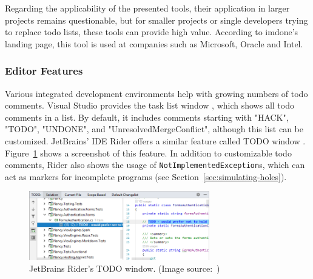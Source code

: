 Regarding the applicability of the presented tools, their application in larger projects remains questionable, but for smaller projects or single developers trying to replace todo lists, these tools can provide high value.
According to imdone's landing page, this tool is used at companies such as Microsoft, Oracle and Intel.

\subsubsection{Editor Features}
\label{sec:todo-comments-ide-features}
Various integrated development environments help with growing numbers of todo comments.
Visual Studio provides the task list window \cite{hogensen_use_2019}, which shows all todo comments in a list.
By default, it includes comments starting with "HACK", "TODO", "UNDONE", and "UnresolvedMergeConflict", although this list can be customized.
JetBrains' \CS IDE Rider offers a similar feature called TODO window \cite{jetbrains_todo_2023}.
Figure~\ref{fig:rider-todo-list} shows a screenshot of this feature.
In addition to customizable todo comments, Rider also shows the usage of \texttt{NotImplementedException}s, which can act as markers for incomplete programs (see Section~\ref{sec:simulating-holes}).
%
\begin{figure}
    \centering
    \includegraphics[width=0.7\textwidth]{images/rider-todo-window}
    \caption{JetBrains Rider's TODO window. (Image source:~\cite{searls_todo_2023})}
    \label{fig:rider-todo-list}
\end{figure}

